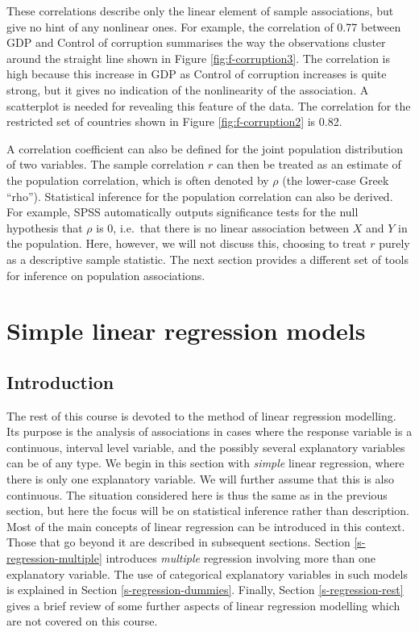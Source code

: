 \documentclass[11pt,a4paper,openany]{book}
\begin{document}
These correlations describe only the linear element of sample
associations, but give no hint of any nonlinear ones. For example, the
correlation of 0.77 between GDP and Control of corruption summarises the
way the observations cluster around the straight line shown in Figure
\ref{fig:f-corruption3}. The correlation is high because this increase
in GDP as Control of corruption increases is quite strong, but it gives
no indication of the nonlinearity of the association. A scatterplot is
needed for revealing this feature of the data. The correlation for the
restricted set of countries shown in Figure \ref{fig:f-corruption2} is
0.82.

A correlation coefficient can also be defined for the joint population
distribution of two variables. The sample correlation \(r\) can then be
treated as an estimate of the population correlation, which is often
denoted by \(\rho\) (the lower-case Greek ``rho''). Statistical
inference for the population correlation can also be derived. For
example, SPSS automatically outputs significance tests for the null
hypothesis that \(\rho\) is 0, i.e.~that there is no linear association
between \(X\) and \(Y\) in the population. Here, however, we will not
discuss this, choosing to treat \(r\) purely as a descriptive sample
statistic. The next section provides a different set of tools for
inference on population associations.

\section{Simple linear regression models}\label{s-regression-simple}

\subsection{Introduction}\label{ss-regression-simple-intro}

The rest of this course is devoted to the method of linear regression
modelling. Its purpose is the analysis of associations in cases where
the response variable is a continuous, interval level variable, and the
possibly several explanatory variables can be of any type. We begin in
this section with \emph{simple} linear regression, where there is only
one explanatory variable. We will further assume that this is also
continuous. The situation considered here is thus the same as in the
previous section, but here the focus will be on statistical inference
rather than description. Most of the main concepts of linear regression
can be introduced in this context. Those that go beyond it are described
in subsequent sections. Section \ref{s-regression-multiple} introduces
\emph{multiple} regression involving more than one explanatory variable.
The use of categorical explanatory variables in such models is explained
in Section \ref{s-regression-dummies}. Finally, Section
\ref{s-regression-rest} gives a brief review of some further aspects of
linear regression modelling which are not covered on this course.
\end{document}
